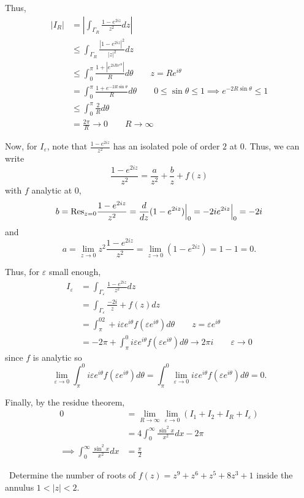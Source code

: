 \documentclass[12pt]{Qual}
\begin{document}
\begin{solution}
Thus, \begin{align*}
    |I_R|&=\left|\int_{\Gamma_R}\frac{1-e^{2iz}}{z^2}dz\right|\\
    &\le\int_{\Gamma_R}\frac{|1-e^{2iz}|^2}{|z|^2}dz\\
    &\le\int_0^\pi\frac{1+|e^{2iRe^{i\theta}}|}{R}d\theta\qquad z=Re^{i\theta}\\
    &=\int_0^\pi\frac{1+e^{-2R\sin\theta}}{R}d\theta\qquad 0\le\sin\theta\le1\implies e^{-2R\sin\theta}\le 1\\
    &\le\int_0^\pi\frac{2}{R}d\theta\\
    &=\frac{2\pi}{R}\to0\qquad R\to\infty
\end{align*}

Now, for $I_\varepsilon$, note that $\frac{1-e^{2iz}}{z^2}$ has an isolated pole of order $2$ at $0$. Thus, we can write $$\frac{1-e^{2iz}}{z^2}=\frac{a}{z^2}+\frac{b}{z}+f(z)$$ with $f$ analytic at $0$, $$b=\text{Res}_{z=0}\frac{1-e^{2iz}}{z^2}=\frac{d}{dz}(1-e^{2iz})\Big|_0=-2ie^{2iz}\Big|_0=-2i$$ and $$a=\lim_{z\to0}z^2\frac{1-e^{2iz}}{z^2}=\lim_{z\to0}(1-e^{2iz})=1-1=0.$$

Thus, for $\varepsilon$ small enough, \begin{align*}
    I_\varepsilon&=\int_{\Gamma_\varepsilon}\frac{1-e^{2iz}}{z^2}dz\\
    &=\int_{\Gamma_\varepsilon}\frac{-2 i}{z}+f(z)dz\\
    &=\int_\pi^02+i\varepsilon e^{i\theta}f(\varepsilon e^{i\theta})d\theta\qquad z=\varepsilon e^{i\theta}\\
    &=-2\pi +\int_\pi^0i\varepsilon e^{i\theta}f(\varepsilon e^{i\theta})d\theta\to 2\pi i\qquad \varepsilon\to0
\end{align*} since $f$ is analytic so $$\lim_{\varepsilon\to0}\int_\pi^0i\varepsilon e^{i\theta}f(\varepsilon e^{i\theta})d\theta=\int_\pi^0\lim_{\varepsilon\to0}i\varepsilon e^{i\theta}f(\varepsilon e^{i\theta})d\theta=0.$$

Finally, by the residue theorem, \begin{align*}
    0&=\lim_{R\to\infty}\lim_{\varepsilon\to0}(I_1+I_2+I_R+I_\varepsilon)\\
    &=4\int_0^\infty\frac{\sin^2x}{x^2}dx-2\pi\\
    \implies \int_0^\infty\frac{\sin^2x}{x^2}dx&=\frac{\pi}{2}
\end{align*}
\end{solution}
\newpage



\begin{problem} $\,$
Determine the number of roots of $f(z)=z^9+z^6+z^5+8z^3+1$ inside the annulus $1<|z|<2$.
\end{problem}
\end{document}
